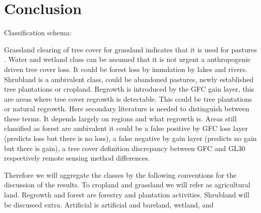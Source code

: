 \chapter{Conclusion}
\label{ch:conclusion}
Classification schema:

Grassland clearing of tree cover for grassland indicates that it is used for pastures . Water and wetland class can be assumed that it is not urgent a anthropogenic driven tree cover loss. It could be forest loss by inundation by lakes and rivers.\cite{Sy2015}
Shrubland is a ambivalent class, could be abandoned pastures, newly established tree plantations or cropland. Regrowth is introduced by the \ac{GFC} gain layer, this are areas where tree cover regrowth is detectable. This could be tree plantations or natural regrowth. Here secondary literature is needed to distinguish between these terms. It depends largely on regions and what regrowth is. Areas still classified as forest are ambivalent it could be a false positive by \ac{GFC} loss layer (predicts loss but there is no loss), a false negative by gain layer (predicts no gain but there is gain), a tree cover definition discrepancy between \ac{GFC} and \ac{GL30} respectively remote sensing method differences.

Therefore we will aggregate the classes by the following conventions for the discussion of the results. To cropland and grassland we will refer as agricultural land. Regrowth and forest are forestry and plantation activities. Shrubland will be discussed extra. Artificial is artificial and bareland, wetland, and 